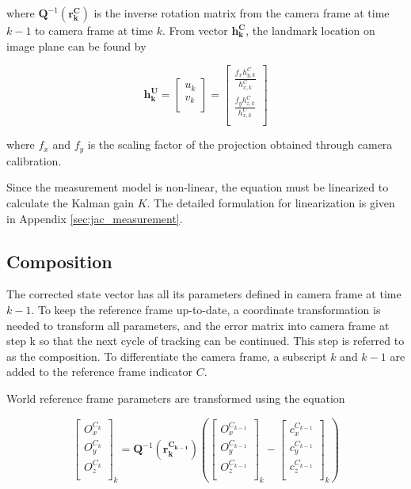\noindent where $\boldsymbol{Q}^{-1}(\boldsymbol{r_{k}^{C}})$ is the inverse
rotation matrix from the camera frame at time $k-1$ to camera frame at
time $k$. From vector $\boldsymbol{h_{k}^{C}}$, the landmark location on
image plane can be found by

\begin{equation}
\boldsymbol{h_{k}^{U}}= \begin{bmatrix}
u_{k} \\
v_{k} \\
\end{bmatrix}=\begin{bmatrix}
\frac{f_{x}h_{y,k}^{C}}{h_{x,k}^{C}} \\
\frac{f_{y}h_{z,k}^{C}}{h_{x,k}^{C}} \\
\end{bmatrix}
\end{equation}

\noindent where $f_{x}$ and $f_{y}$ is the scaling factor of the projection 
obtained through camera calibration.

Since the measurement model is non-linear, the equation must be
linearized to calculate the Kalman gain $K$. The detailed formulation for
linearization is given in Appendix \ref{sec:jac_measurement}.

\subsection{Composition}

The corrected state vector has all its parameters defined in camera
frame at time $k-1$. To keep the reference frame up-to-date, a coordinate
transformation is needed to transform all parameters, and the error matrix
into camera frame at step k so that the next cycle of tracking can be
continued. This step is referred to as the composition. To
differentiate the camera frame, a subscript $k$ and $k-1$ are added to
the reference frame indicator $C$.

World reference frame parameters are transformed using the equation

\begin{equation}
\begin{bmatrix}
O_{x}^{C_{k}} \\
O_{y}^{C_k} \\
O_{z}^{C_k} \\
\end{bmatrix}_{k}=\boldsymbol{Q}^{-1}(\boldsymbol{r_{k}^{C_{k-1}}})\left(
\begin{bmatrix}
O_{x}^{C_{k-1}} \\
O_{y}^{C_{k-1}} \\
O_{z}^{C_{k-1}} \\
\end{bmatrix}_{k}- \begin{bmatrix}
c_{x}^{C_{k-1}} \\
c_{y}^{C_{k-1}} \\
c_{z}^{C_{k-1}} \\
\end{bmatrix}_{k}\right)
\end{equation}

